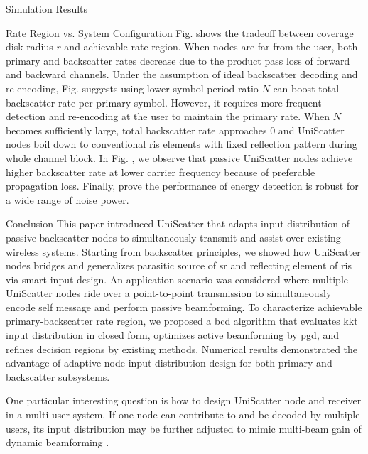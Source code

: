 \documentclass[journal]{IEEEtran}
\begin{document}
\begin{section}{Simulation Results}
\begin{subsection}{Rate Region vs. System Configuration}
		Fig.  shows the tradeoff between coverage disk radius $r$ and achievable rate region.
		When nodes are far from the user, both primary and backscatter rates decrease due to the product pass loss of forward and backward channels.
		Under the assumption of ideal backscatter decoding and re-encoding, Fig.  suggests using lower symbol period ratio $N$ can boost total backscatter rate per primary symbol.
		However, it requires more frequent detection and re-encoding at the user to maintain the primary rate.
		When $N$ becomes sufficiently large, total backscatter rate approaches \num{0} and UniScatter nodes boil down to conventional \gls{ris} elements with fixed reflection pattern during whole channel block.
		In Fig. , we observe that passive UniScatter nodes achieve higher backscatter rate at lower carrier frequency because of preferable propagation loss.
		Finally,  prove the performance of energy detection is robust for a wide range of noise power.
	\end{subsection}
\end{section}

\begin{section}{Conclusion}
	This paper introduced UniScatter that adapts input distribution of passive backscatter nodes to simultaneously transmit and assist over existing wireless systems.
	Starting from backscatter principles, we showed how UniScatter nodes bridges and generalizes parasitic source of \gls{sr} and reflecting element of \gls{ris} via smart input design.
	An application scenario was considered where multiple UniScatter nodes ride over a point-to-point transmission to simultaneously encode self message and perform passive beamforming.
	To characterize achievable primary-backscatter rate region, we proposed a \gls{bcd} algorithm that evaluates \gls{kkt} input distribution in closed form, optimizes active beamforming by \gls{pgd}, and refines decision regions by existing methods.
	Numerical results demonstrated the advantage of adaptive node input distribution design for both primary and backscatter subsystems.

	One particular interesting question is how to design UniScatter node and receiver in a multi-user system.
	If one node can contribute to and be decoded by multiple users, its input distribution may be further adjusted to mimic multi-beam gain of dynamic beamforming \cite{Qiu2022}.
\end{section}
\end{document}
